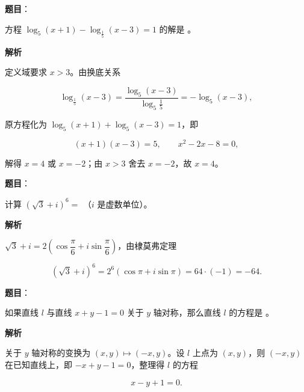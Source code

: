 \begin{answer}

\textbf{题目}：

方程 $\log_{5}(x+1)-\log_{\frac{1}{5}}(x-3)=1$ 的解是 \gkblank{}。

\textbf{解析}

定义域要求 $x>3$。由换底关系

\nopagebreak[4]
\[
\log_{\frac{1}{5}}(x-3)=\frac{\log_{5}(x-3)}{\log_{5}\frac{1}{5}}=-\log_{5}(x-3),
\]

原方程化为 $\log_{5}(x+1)+\log_{5}(x-3)=1$，即

\nopagebreak[4]
\[
(x+1)(x-3)=5,\qquad x^{2}-2x-8=0,
\]

解得 $x=4$ 或 $x=-2$；由 $x>3$ 舍去 $x=-2$，故 $x=4$。


\end{answer}
\begin{answer}

\textbf{题目}：

计算 $(\sqrt{3}+i)^{6}=$ \gkblank{}（$i$ 是虚数单位）。

\textbf{解析}

$\sqrt{3}+i=2\left(\cos\dfrac{\pi}{6}+i\sin\dfrac{\pi}{6}\right)$，由棣莫弗定理

\nopagebreak[4]
\[
(\sqrt{3}+i)^{6}=2^{6}\left(\cos\pi+i\sin\pi\right)=64\cdot(-1)=-64.
\]


\end{answer}
\begin{answer}

\textbf{题目}：

如果直线 $l$ 与直线 $x+y-1=0$ 关于 $y$ 轴对称，那么直线 $l$ 的方程是 \gkblank{}。

\textbf{解析}

关于 $y$ 轴对称的变换为 $(x,y)\mapsto(-x,y)$。设 $l$ 上点为 $(x,y)$，则 $(-x,y)$ 在已知直线上，即 $-x+y-1=0$，整理得 $l$ 的方程

\nopagebreak[4]
\[
x-y+1=0.
\]


\end{answer}

